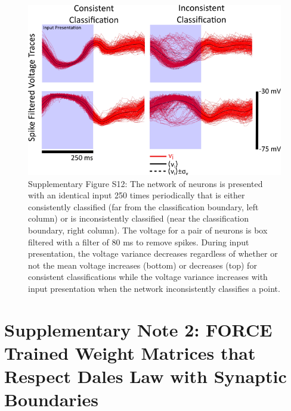 \documentclass[11pt]{article} %
\begin{document}
\begin{figure}[htp!]
\centering
\includegraphics[scale=0.9]{FFIGS14}
\caption*{Supplementary Figure S12: The network of neurons is presented with an identical input 250 times periodically that is either consistently classified (far from the classification boundary, left column) or is inconsistently classified (near the classification boundary, right column).  The voltage for a pair of neurons is box filtered with a filter of 80 ms to remove spikes.  During input presentation, the voltage variance decreases regardless of whether or not the mean voltage increases (bottom) or decreases (top) for consistent classifications while the voltage variance increases with input presentation when the network inconsistently classifies a point. }
\end{figure}
\clearpage 



\section*{Supplementary Note 2: FORCE Trained Weight Matrices that Respect Dales Law with Synaptic Boundaries} 
\end{document}
